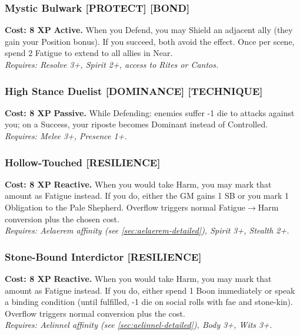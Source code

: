 \subsubsection*{Mystic Bulwark \textnormal{[PROTECT] [BOND]}}
\label{talent:mystic-bulwark}
\textbf{Cost: 8 XP} \textbf{Active.} When you Defend, you may Shield an adjacent ally (they gain your Position bonus). If you succeed, both avoid the effect. Once per scene, spend 2 Fatigue to extend to all allies in Near. \\
\textit{Requires: Resolve 3+, Spirit 2+, access to Rites or Cantos.}

\subsubsection*{High Stance Duelist \textnormal{[DOMINANCE] [TECHNIQUE]}}
\label{talent:high-stance-duelist}
\textbf{Cost: 8 XP} \textbf{Passive.} While Defending: enemies suffer -1 die to attacks against you; on a Success, your riposte becomes Dominant instead of Controlled. \\
\textit{Requires: Melee 3+, Presence 1+.}

\subsubsection*{Hollow-Touched \textnormal{[RESILIENCE]}}
\label{talent:hollow-touched}
\textbf{Cost: 8 XP} \textbf{Reactive.} When you would take Harm, you may mark that amount as Fatigue instead. If you do, either the GM gains 1 SB or you mark 1 Obligation to the Pale Shepherd. Overflow triggers normal Fatigue$\rightarrow$Harm conversion plus the chosen cost. \\
\textit{Requires: Aelaerem affinity (see \ref{sec:aelaerem-detailed}), Spirit 3+, Stealth 2+.}

\subsubsection*{Stone-Bound Interdictor \textnormal{[RESILIENCE]}}
\label{talent:stone-bound-interdictor}
\textbf{Cost: 8 XP} \textbf{Reactive.} When you would take Harm, you may mark that amount as Fatigue instead. If you do, either spend 1 Boon immediately or speak a binding condition (until fulfilled, -1 die on social rolls with fae and stone-kin). Overflow triggers normal conversion plus the cost. \\
\textit{Requires: Aelinnel affinity (see \ref{sec:aelinnel-detailed}), Body 3+, Wits 3+.}

